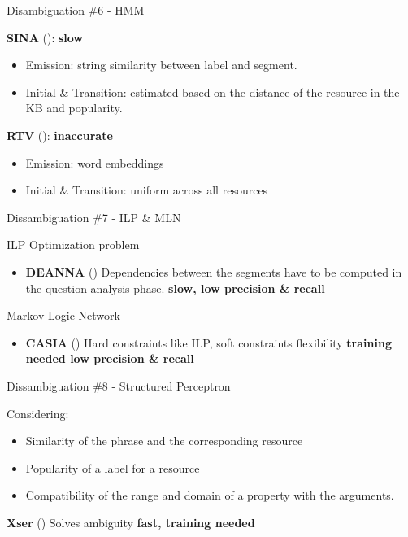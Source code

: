 \documentclass{beamer}
\begin{document}
\begin{frame}{Disambiguation \#6 - HMM}
  \begin{card}
    \textbf{SINA} (\cite{shekarpour2015a}): \textbf{slow}
    \begin{itemize}
      \item Emission: string similarity between label and segment.
      \item Initial \& Transition: estimated based on the distance of the resource in the KB and popularity.
    \end{itemize}
  \end{card}
  \begin{card}
    \textbf{RTV} (\cite{giannone2013a}): \textbf{inaccurate}
    \begin{itemize}
      \item Emission: word embeddings
      \item Initial \& Transition: uniform across all resources
    \end{itemize}
  \end{card}
\end{frame}

\begin{frame}{Dissambiguation \#7 - ILP \& MLN}
  \begin{card}
    ILP Optimization problem
    \begin{itemize}
      \item \textbf{DEANNA} (\cite{yahya2013a}) Dependencies between the segments have to be computed in the question analysis phase. \textbf{slow, low precision \& recall}
    \end{itemize}
  \end{card}
  \begin{card}
    Markov Logic Network
    \begin{itemize}
      \item \textbf{CASIA} (\cite{he2014a}) Hard constraints like ILP, soft constraints flexibility \textbf{training needed low precision \& recall}
    \end{itemize}
  \end{card}
\end{frame}

\begin{frame}{Dissambiguation \#8 - Structured Perceptron}
  \begin{card}
    Considering:
    \begin{itemize}
      \item Similarity of the phrase and the corresponding resource
      \item Popularity of a label for a resource
      \item Compatibility of the range and domain of a property with the arguments.
    \end{itemize}
    \textbf{Xser} (\cite{xu2014a}) Solves ambiguity \textbf{fast, training needed}
  \end{card}
\end{frame}
\end{document}
